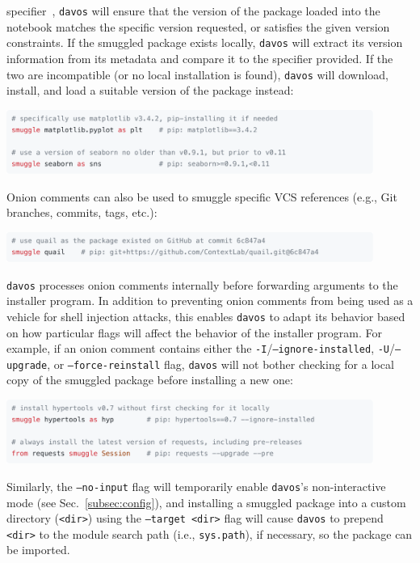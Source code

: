 \documentclass[preprint,12pt,a4paper]{elsarticle}
\begin{document}
specifier~\cite{CoghStuf13}, \texttt{davos} will ensure that the
version of the package loaded into the notebook matches the specific
version requested, or satisfies the given version constraints. If the
smuggled package exists locally, \texttt{davos} will extract its
version information from its metadata and compare it to the specifier
provided. If the two are incompatible (or no local installation is
found), \texttt{davos} will download, install, and load a suitable
version of the package instead:
\begin{center}
\includegraphics[width=0.9\textwidth]{figs/snippet3}
\end{center}
Onion comments can also be used to smuggle specific VCS references
(e.g., Git~\cite{TorvHama05} branches, commits, tags, etc.):
\begin{center}
\includegraphics[width=0.9\textwidth]{figs/snippet4}
\end{center}
\texttt{davos} processes onion comments internally before forwarding
arguments to the installer program. In addition to preventing onion
comments from being used as a vehicle for shell injection attacks,
this enables \texttt{davos} to adapt its behavior based on how particular
flags will affect the behavior of the installer program. For example, if an
onion comment contains either the \texttt{-I}/\texttt{--ignore-installed},
\texttt{-U}/\texttt{--upgrade}, or \texttt{--force-reinstall} flag,
\texttt{davos} will not bother checking for a local copy of the smuggled
package before installing a new one:
\begin{center}
\includegraphics[width=0.9\textwidth]{figs/snippet5}
\end{center}
Similarly, the \texttt{--no-input} flag will temporarily enable
\texttt{davos}'s non-interactive mode (see
Sec.~\ref{subsec:config}), and installing a smuggled package into a
custom directory (\texttt{<dir>}) using the \texttt{--target <dir>}
flag will cause \texttt{davos} to prepend \texttt{<dir>} to the module
search path (i.e., \texttt{sys.path}), if necessary, so the package
can be imported.
\end{document}
